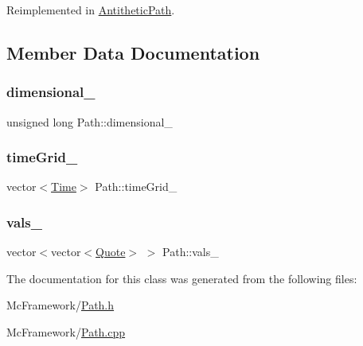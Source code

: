 Reimplemented in \hyperlink{class_antithetic_path_ad15cfc2a074fd27bd3119ddafa24c3bd}{Antithetic\+Path}.



\subsection{Member Data Documentation}
\hypertarget{class_path_a577d3370c9142a9e73c2118799c6a8a2}{}\label{class_path_a577d3370c9142a9e73c2118799c6a8a2} 
\subsubsection{\texorpdfstring{dimensional\+\_\+}{dimensional\_}}
{\footnotesize\ttfamily unsigned long Path\+::dimensional\+\_\+\hspace{0.3cm}{\ttfamily [private]}}

\hypertarget{class_path_a89dcf892f7c979692e1bdb12811a2db1}{}\label{class_path_a89dcf892f7c979692e1bdb12811a2db1} 
\subsubsection{\texorpdfstring{time\+Grid\+\_\+}{timeGrid\_}}
{\footnotesize\ttfamily vector$<$\hyperlink{_name_def_8h_ac2d3e0ba793497bcca555c7c2cf64ff3}{Time}$>$ Path\+::time\+Grid\+\_\+\hspace{0.3cm}{\ttfamily [private]}}

\hypertarget{class_path_ac8b906724bca24f9ec14ad754559e27a}{}\label{class_path_ac8b906724bca24f9ec14ad754559e27a} 
\subsubsection{\texorpdfstring{vals\+\_\+}{vals\_}}
{\footnotesize\ttfamily vector$<$vector$<$\hyperlink{_name_def_8h_a642a6c5fd87319d922637de0e0bb0305}{Quote}$>$ $>$ Path\+::vals\+\_\+\hspace{0.3cm}{\ttfamily [private]}}



The documentation for this class was generated from the following files\+:\begin{DoxyCompactItemize}
\item 
Mc\+Framework/\hyperlink{_path_8h}{Path.\+h}\item 
Mc\+Framework/\hyperlink{_path_8cpp}{Path.\+cpp}\end{DoxyCompactItemize}

